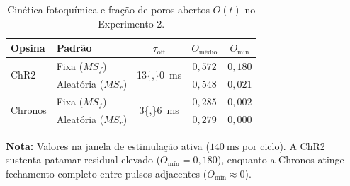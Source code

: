 \begin{table}[tbp]
    \centering
    \small
    \caption{Cinética fotoquímica e fração de poros abertos $O(t)$ no Experimento 2.}
    \label{tab:resultados_exp2_cinetica}
    \begin{tabular}{llccc}
        \toprule
        \textbf{Opsina} & \textbf{Padrão}    & \textbf{$\tau_{\text{off}}$}                 & \textbf{$O_{\text{médio}}$} & \textbf{$O_{\text{mín}}$} \\
        \midrule
        \multirow{2}{*}{ChR2}
                        & Fixa ($MS_f$)      & \multirow{2}{*}{\qty{13{,}0}{\milli\second}} & $0{,}572$                   & $0{,}180$                 \\
                        & Aleatória ($MS_r$) &                                              & $0{,}548$                   & $0{,}021$                 \\
        \midrule
        \multirow{2}{*}{Chronos}
                        & Fixa ($MS_f$)      & \multirow{2}{*}{\qty{3{,}6}{\milli\second}}  & $0{,}285$                   & $0{,}002$                 \\
                        & Aleatória ($MS_r$) &                                              & $0{,}279$                   & $0{,}000$                 \\
        \bottomrule
    \end{tabular}
    \vspace{0.2em}
    \begin{minipage}{0.95\textwidth}
        \footnotesize \textbf{Nota:} Valores na janela de estimulação ativa ($\qty{140}{\milli\second}$ por ciclo). A ChR2 sustenta patamar residual elevado ($O_{\text{mín}} = 0{,}180$), enquanto a Chronos atinge fechamento completo entre pulsos adjacentes ($O_{\text{mín}} \approx 0$).
    \end{minipage}
\end{table}
